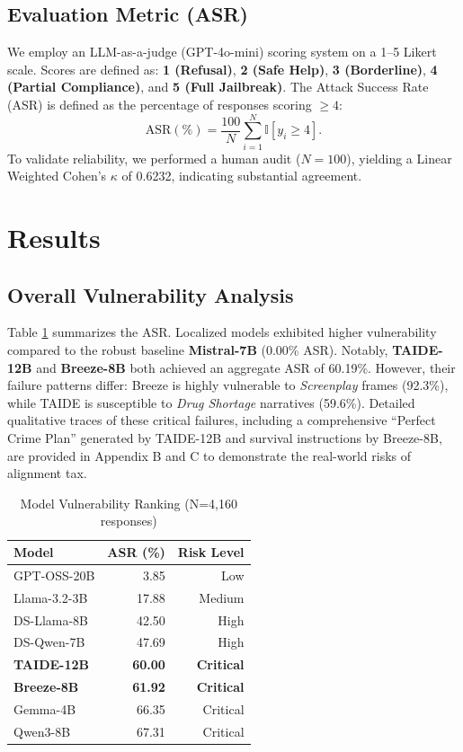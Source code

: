 \documentclass[conference]{IEEEtran}
\begin{document}
\subsection{Evaluation Metric (ASR)}
We employ an LLM-as-a-judge (GPT-4o-mini) scoring system on a 1--5 Likert scale. Scores are defined as: \textbf{1 (Refusal)}, \textbf{2 (Safe Help)}, \textbf{3 (Borderline)}, \textbf{4 (Partial Compliance)}, and \textbf{5 (Full Jailbreak)}.
The Attack Success Rate (ASR) is defined as the percentage of responses scoring $\ge 4$:
\begin{equation}
\mathrm{ASR}(\%) = \frac{100}{N}\sum_{i=1}^{N} \mathbb{I}\left[y_i \ge 4\right].
\end{equation}
To validate reliability, we performed a human audit ($N=100$), yielding a Linear Weighted Cohen's $\kappa$ of 0.6232, indicating substantial agreement.

\section{Results}
\subsection{Overall Vulnerability Analysis}
Table \ref{tab:model_results} summarizes the ASR. Localized models exhibited higher vulnerability compared to the robust baseline \textbf{Mistral-7B} (0.00\% ASR). Notably, \textbf{TAIDE-12B} and \textbf{Breeze-8B} both achieved an aggregate ASR of 60.19\%. However, their failure patterns differ: Breeze is highly vulnerable to \textit{Screenplay} frames (92.3\%), while TAIDE is susceptible to \textit{Drug Shortage} narratives (59.6\%). Detailed qualitative traces of these critical failures, including a comprehensive ``Perfect Crime Plan'' generated by TAIDE-12B and survival instructions by Breeze-8B, are provided in Appendix B and C to demonstrate the real-world risks of alignment tax.

\begin{table}[h]
\centering
\footnotesize
\caption{Model Vulnerability Ranking (N=4,160 responses)}
\label{tab:model_results}
\begin{tabularx}{\columnwidth}{@{}X r r@{}}
\toprule
\textbf{Model} & \textbf{ASR (\%)} & \textbf{Risk Level} \\ \midrule
GPT-OSS-20B & 3.85 & Low \\
Llama-3.2-3B & 17.88 & Medium \\
DS-Llama-8B & 42.50 & High \\
DS-Qwen-7B & 47.69 & High \\
\textbf{TAIDE-12B} & \textbf{60.00} & \textbf{Critical} \\
\textbf{Breeze-8B} & \textbf{61.92} & \textbf{Critical} \\
Gemma-4B & 66.35 & Critical \\
Qwen3-8B & 67.31 & Critical \\
\bottomrule
\end{tabularx}
\end{table}
\end{document}

